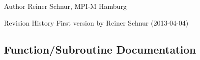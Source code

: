 \begin{DoxyAuthor}{Author}
Reiner Schnur, M\+P\+I-\/\+M Hamburg
\end{DoxyAuthor}
\begin{DoxyParagraph}{Revision History}
First version by Reiner Schnur (2013-\/04-\/04) 
\end{DoxyParagraph}


\subsection{Function/\+Subroutine Documentation}
\hypertarget{namespacemo__atmland__interface_a7bffd74cd79c834a484b49e338156eb0}{}
